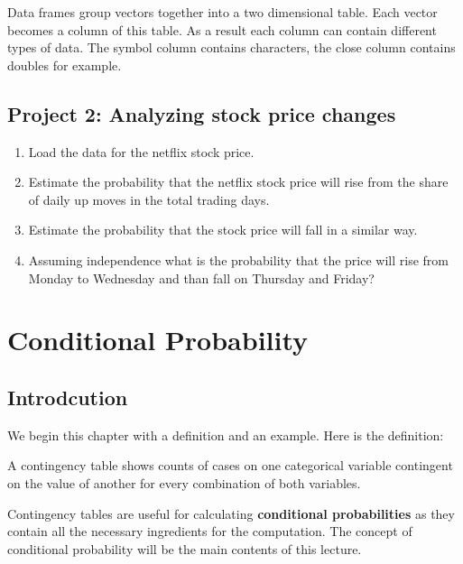 \documentclass[
]{book}
\providecommand{\tightlist}{%
  \setlength{\itemsep}{0pt}\setlength{\parskip}{0pt}}
\begin{document}
Data frames group vectors together into a two dimensional table. Each vector becomes a column
of this table. As a result each column can contain different types of data. The symbol
column contains characters, the close column contains doubles for example.

\hypertarget{project-2-analyzing-stock-price-changes}{%
\section{Project 2: Analyzing stock price changes}\label{project-2-analyzing-stock-price-changes}}

\begin{enumerate}
\def\labelenumi{\arabic{enumi}.}
\tightlist
\item
  Load the data for the netflix stock price.
\item
  Estimate the probability that the netflix stock
  price will rise from the share of daily up moves in the total trading days.
\item
  Estimate the
  probability that the stock price will fall in a similar way.
\item
  Assuming independence what is
  the probability that the price will rise from Monday to Wednesday and than fall on
  Thursday and Friday?
\end{enumerate}

\hypertarget{conditional-probability}{%
\chapter{Conditional Probability}\label{conditional-probability}}

\hypertarget{introdcution}{%
\section{Introdcution}\label{introdcution}}

We begin this chapter with a definition and an example. Here is the definition:

\begin{description}
\tightlist
\item[Contingency Table]
A contingency table shows counts of cases on one categorical variable contingent
on the value of another for every combination of both variables.
\end{description}

Contingency tables are useful for calculating \textbf{conditional probabilities} as they
contain all the necessary ingredients for the computation. The concept of
conditional probability will be the main contents of this lecture.
\end{document}
